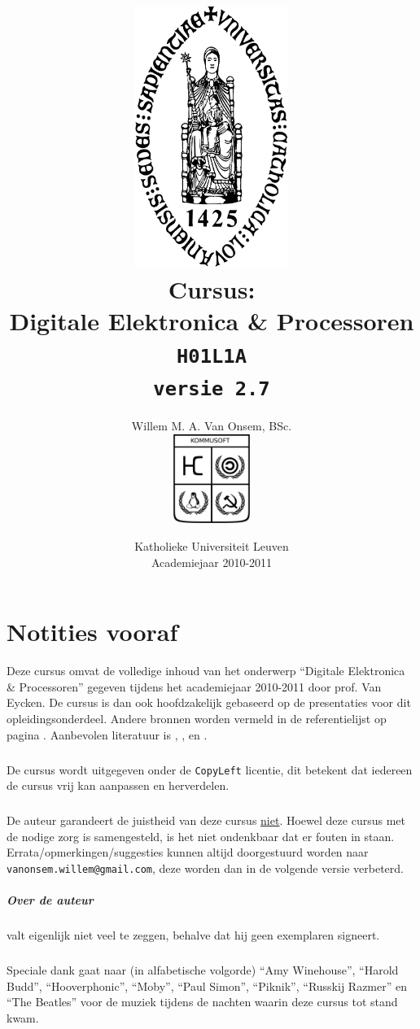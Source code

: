\documentclass[a4paper,10pt,titlepage]{book}
\title{\includegraphics[width=5cm]{../SharedData/sedes.pdf}\\Cursus:\\Digitale Elektronica \& Processoren\\\texttt{H01L1A}\\\texttt{\small versie 2.7}}
\author{Willem M. A. Van Onsem, BSc.\\\includegraphics[width=2.5cm]{../SharedData/kommusoftEmblema.pdf}}
\date{Katholieke Universiteit Leuven\\Academiejaar 2010-2011}
\begin{document}
\frontmatter
\begin{titlepage}
\maketitle
\end{titlepage}
\tableofcontents
\chapter*{Notities vooraf}
\begin{it}
Deze cursus omvat de volledige inhoud van het onderwerp ``Digitale Elektronica \& Processoren'' gegeven tijdens het academiejaar 2010-2011 door prof. Van Eycken. De cursus is dan ook hoofdzakelijk gebaseerd op de presentaties voor dit opleidingsonderdeel. Andere bronnen worden vermeld in de referentielijst op pagina \pageref{biblio}. Aanbevolen literatuur is \cite{brown2004fundamentals}, \cite{gajski1997principles}, \cite{wakerly2000digital} en \cite{ashenden2008designer}.

\paragraph{}
De cursus wordt uitgegeven onder de \texttt{CopyLeft} licentie, dit betekent dat iedereen de cursus vrij kan aanpassen en herverdelen.

\paragraph{}
De auteur garandeert de juistheid van deze cursus \underline{niet}. Hoewel deze cursus met de nodige zorg is samengesteld, is het niet ondenkbaar dat er fouten in staan. Errata/opmerkingen/suggesties kunnen altijd doorgestuurd worden naar \verb+vanonsem.willem@gmail.com+, deze worden dan in de volgende versie verbeterd.

\paragraph{Over de auteur}
valt eigenlijk niet veel te zeggen, behalve dat hij geen exemplaren signeert.

\paragraph{}
Speciale dank gaat naar (in alfabetische volgorde) ``Amy Winehouse'', ``Harold Budd'', ``Hooverphonic'', ``Moby'', ``Paul Simon'', ``Piknik'', ``Russkij Razmer'' en ``The Beatles'' voor de muziek tijdens de nachten waarin deze cursus tot stand kwam.


\end{it}
\end{document}
